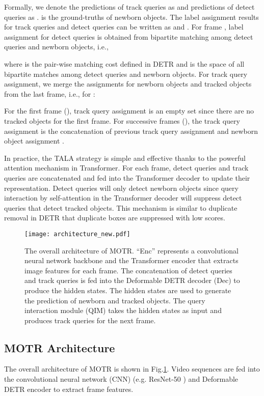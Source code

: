 \documentclass[runningheads]{llncs}
\begin{document}
Formally, we denote the predictions of track queries as  and predictions of detect queries as .
 is the ground-truths of newborn objects.
The label assignment results for track queries and detect queries can be written as  and .
For frame , label assignment for detect queries is obtained from bipartite matching among detect queries and newborn objects, i.e.,

where  is the pair-wise matching cost defined in DETR and  is the space of all bipartite matches among detect queries and newborn objects.
For track query assignment, we merge the assignments for newborn objects and tracked objects from the last frame, i.e., for :

For the first frame (), track query assignment  is an empty set  since there are no tracked objects for the first frame.
For successive frames (), the track query assignment  is the concatenation of previous track query assignment  and newborn object assignment .



In practice, the TALA strategy is simple and effective thanks to the powerful attention mechanism in Transformer.
For each frame, detect queries and track queries are concatenated and fed into the Transformer decoder to update their representation.
Detect queries will only detect newborn objects since query interaction by self-attention in the Transformer decoder will suppress detect queries that detect tracked objects.
This mechanism is similar to duplicate removal in DETR that duplicate boxes are suppressed with low scores.

\begin{figure}[t]
  \centering
  \texttt{[image: architecture\_new.pdf]}
  \caption{The overall architecture of MOTR. ``Enc'' represents a convolutional neural network backbone and the Transformer encoder that extracts image features for each frame. The concatenation of detect queries  and track queries  is fed into the Deformable DETR decoder (Dec) to produce the hidden states. The hidden states are used to generate the prediction  of newborn and tracked objects. The query interaction module (QIM) takes the hidden states as input and produces track queries for the next frame.}
  \label{architecture}
\end{figure}

\subsection{MOTR Architecture}
\label{iterative_track}
The overall architecture of MOTR is shown in Fig.\;\ref{architecture}.
Video sequences are fed into the convolutional neural network (CNN) (e.g. ResNet-50 \cite{He2016Resnet}) and Deformable DETR \cite{zhu2020deformdetr} encoder to extract frame features.
\end{document}
